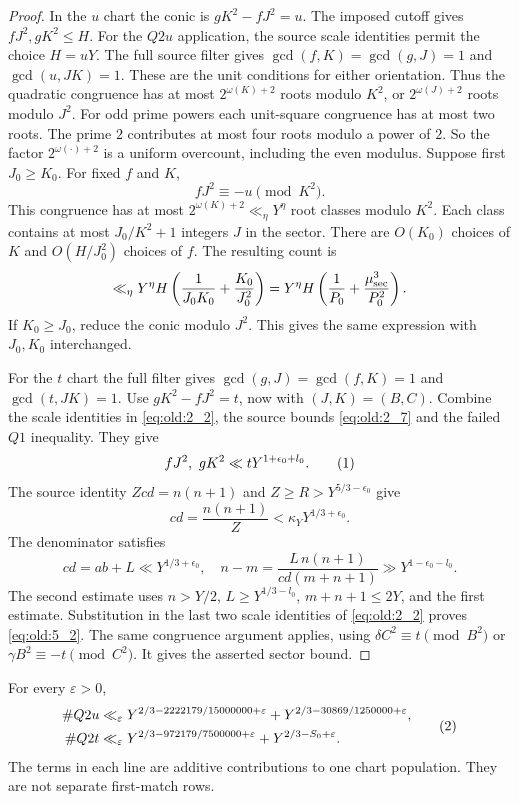 \begin{proof}
In the \(u\) chart the conic is \(gK^2-fJ^2=u\). The imposed cutoff
gives \(fJ^2,gK^2\le H\). For the \(Q2u\) application, the source scale
identities permit the choice \(H=uY\).
The full source filter gives \(\gcd(f,K)=\gcd(g,J)=1\) and
\(\gcd(u,JK)=1\). These are the unit conditions for either orientation.
Thus the quadratic congruence has at most \(2^{\omega(K)+2}\) roots
modulo \(K^2\), or \(2^{\omega(J)+2}\) roots modulo \(J^2\).
For odd prime powers each unit-square congruence has at most two roots.
The prime \(2\) contributes at most four roots modulo a power of \(2\).
So the factor \(2^{\omega(\cdot)+2}\) is a uniform
overcount, including the even modulus.
Suppose first \(J_0\ge K_0\). For fixed \(f\) and \(K\),
\[
fJ^2\equiv-u\pmod{K^2}.
\]
This congruence has at most \(2^{\omega(K)+2}\ll_\eta Y^\eta\)
root classes modulo \(K^2\). Each class contains at most
\(J_0/K^2+1\) integers \(J\) in the sector. There are
\(O(K_0)\) choices of \(K\) and \(O(H/J_0^2)\) choices of \(f\).
The resulting count is
\[
\ll_\eta Y^\eta H
\left(\frac1{J_0K_0}+\frac{K_0}{J_0^2}\right)
=Y^\eta H\left(\frac1{P_0}+\frac{\mu_{\rm sec}^3}{P_0^2}\right).
\]
If \(K_0\ge J_0\), reduce the conic modulo \(J^2\). This gives the
same expression with \(J_0,K_0\) interchanged.

For the \(t\) chart the full filter gives
\(\gcd(g,J)=\gcd(f,K)=1\) and \(\gcd(t,JK)=1\). Use
\(gK^2-fJ^2=t\), now with \((J,K)=(B,C)\).
Combine the scale identities in \eqref{eq:old:2_2}, the source bounds
\eqref{eq:old:2_7} and the failed \(Q1\) inequality. They give
\[
fJ^2,\ gK^2\ll tY^{1+\epsilon_0+l_0}.
\AutoTag{eq:old:5_2}
\]
The source identity \(Zcd=n(n+1)\) and \(Z\ge R>Y^{5/3-\epsilon_0}\)
give
\[
cd=\frac{n(n+1)}Z<\kappa_Y Y^{1/3+\epsilon_0}.
\]
The denominator satisfies
\[
cd=ab+L\ll Y^{1/3+\epsilon_0},\quad
n-m=\frac{L\,n(n+1)}{cd(m+n+1)}
\gg Y^{1-\epsilon_0-l_0}.
\]
The second estimate uses \(n>Y/2\), \(L\ge Y^{1/3-l_0}\),
\(m+n+1\le2Y\), and the first estimate. Substitution in the last two
scale identities of \eqref{eq:old:2_2} proves \eqref{eq:old:5_2}. The same
congruence argument applies, using \(\delta C^2\equiv t\pmod{B^2}\) or
\(\gamma B^2\equiv -t\pmod{C^2}\). It gives the asserted sector bound.
\end{proof}

\begin{proposition}\label{prop:q2}
For every \(\varepsilon>0\),
\[
\begin{aligned}
\#Q2u&\ll_\varepsilon
Y^{2/3-2222179/15000000+\varepsilon}
+Y^{2/3-30869/1250000+\varepsilon},\\
\#Q2t&\ll_\varepsilon
Y^{2/3-972179/7500000+\varepsilon}
+Y^{2/3-S_0+\varepsilon}.
\end{aligned}\AutoTag{eq:old:5_3}
\]
The terms in each line are additive contributions to one chart
population. They are not separate first-match rows.
\end{proposition}

